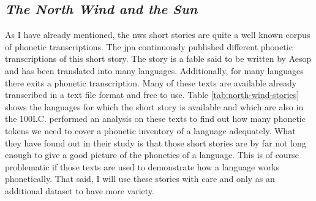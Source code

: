 
\subsection{\textit{The North Wind and the Sun}}
\label{nws}
As I have already mentioned, the \ac{nws} short stories are quite a well known corpus of phonetic transcriptions. The \ac{jpa} continuously published different phonetic transcriptions of this short story. The story is a fable said to be written by Aesop and has been translated into many languages. Additionally, for many languages there exits a phonetic transcription. Many of these texts are available already transcribed in a text file format and free to use. Table \ref{tab:north-wind-stories} shows the languages for which the short story is available and which are also in the 100LC. \citet{baird_evans_greenhill_2021} performed an analysis on these texts to find out how many phonetic tokens we need to cover a phonetic inventory of a language adequately. What they have found out in their study is that those short stories are by far not long enough to give a good picture of the phonetics of a language. This is of course problematic if those texts are used to demonstrate how a language works phonetically. That said, I will use these stories with care and only as an additional dataset to have more variety.

